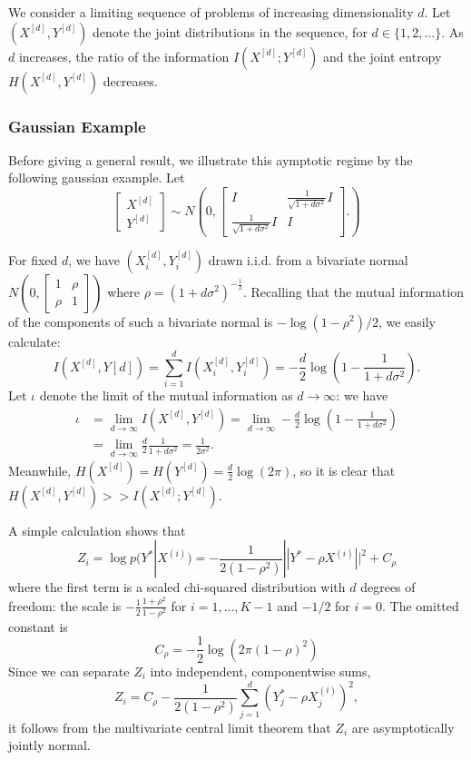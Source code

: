 \documentclass[12pt]{article}
\begin{document}
We consider a limiting sequence of problems of increasing
dimensionality $d$.  Let $(X^{[d]}, Y^{[d]})$ denote the joint
distributions in the sequence, for $d \in \{1, 2, \hdots\}.$ As $d$
increases, the ratio of the information $I(X^{[d]}; Y^{[d]})$ and the
joint entropy $H(X^{[d]}, Y^{[d]})$ decreases.

\subsubsection{Gaussian Example}

Before giving a general result, we illustrate this aymptotic regime by
the following gaussian example.  Let
\[
\begin{bmatrix}
X^{[d]}\\Y^{[d]}
\end{bmatrix} \sim 
N\left(
0, \begin{bmatrix}
I & \frac{1}{\sqrt{1 + d\sigma^2}}I \\
\frac{1}{\sqrt{1 + d\sigma^2}} I & I
\end{bmatrix}.
\right)
\]

For fixed $d$, we have $(X_i^{[d]}, Y_i^{[d]})$ drawn i.i.d. from a
bivariate normal $N(0, \begin{bmatrix}1 & \rho\\\rho &
1\end{bmatrix})$ where $\rho = (1 + d\sigma^2)^{-\frac{1}{2}}$.  Recalling that
the mutual information of the components of such a bivariate normal is
$-\log(1 - \rho^2)/2$, we easily calculate:
\[
I(X^{[d]}, Y{[d]}) = \sum_{i=1}^d I(X_i^{[d]}, Y_i^{[d]}) = -\frac{d}{2}\log(1 - \frac{1}{1+d\sigma^2}).
\]
Let $\iota$ denote the limit of the mutual information as $d \to \infty$: we have
\begin{align*}
\iota &= \lim_{d \to \infty} I(X^{[d]}, Y^{[d]}) =
\lim_{d \to \infty} -\frac{d}{2}\log(1 - \frac{1}{1+d\sigma^2}) 
\\&= \lim_{d \to \infty}\frac{d}{2}\frac{1}{1+d\sigma^2} = \frac{1}{2\sigma^2}.
\end{align*}
Meanwhile, $H(X^{[d]}) = H(Y^{[d]}) = \frac{d}{2}\log(2\pi)$, so it is clear that $H(X^{[d]}, Y^{[d]}) >> I(X^{[d]}; Y^{[d]})$.

A simple calculation shows that
\[
Z_i = \log p(Y^*|X^{(i)}) = -\frac{1}{2(1-\rho^2)}||Y^* -\rho X^{(i)} ||^2 + C_\rho
\]
where the first term is a scaled chi-squared distribution with $d$
degrees of freedom: the scale is $-\frac{1}{2}\frac{1 + \rho^2}{1-\rho^2}$ for $i = 1,\hdots, K-1$ and
$-1/2$ for $i = 0$.  
The omitted constant is
\[
C_\rho = -\frac{1}{2}\log(2\pi(1-\rho)^2)
\]
Since we can separate $Z_i$ into
independent, componentwise sums,
\[
Z_i = C_\rho -\frac{1}{2(1-\rho^2)} \sum_{j=1}^d (Y^*_j - \rho X^{(i)}_j)^2,
\]
it follows from the multivariate central limit theorem that $Z_i$ are asymptotically jointly normal.
\end{document}
